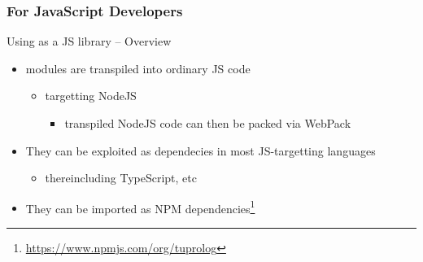 \documentclass[handout]{beamer}
\begin{document}
\subsubsection{For JavaScript Developers}

\begin{frame}{Using \twopkt{} as a JS library -- Overview}
    \begin{itemize}
        \item \twopkt{} modules are transpiled into ordinary JS code
        \begin{itemize}
            \item targetting \alert{NodeJS}
            \begin{itemize}
                \item transpiled NodeJS code can then be packed via \alert{WebPack}
            \end{itemize}
        \end{itemize} 
        
        \vfill

        \item They can be exploited as dependecies in most JS-targetting languages
        \begin{itemize}
            \item thereincluding TypeScript, etc
        \end{itemize}

        \vfill

        \item They can be imported as NPM dependencies\footnote{\url{https://www.npmjs.com/org/tuprolog}}
    \end{itemize}
\end{frame}
\end{document}
